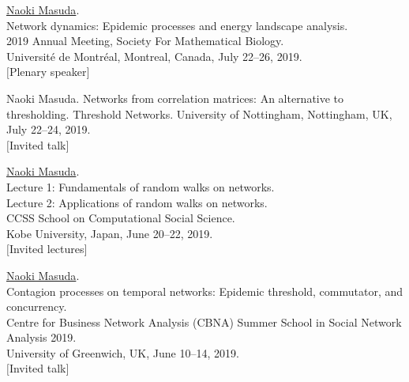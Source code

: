 \documentclass[11pt,letter]{article}
\begin{document}
\begin{etaremune}
\item \underline{Naoki Masuda}.\\
Network dynamics: Epidemic processes and energy landscape analysis.\\
2019 Annual Meeting, Society For Mathematical Biology.\\
Universit\'{e} de Montr\'{e}al, Montreal, Canada, July 22--26, 2019.\\
$[$Plenary speaker$]$

\item Naoki Masuda.
Networks from correlation matrices: An alternative to thresholding.
Threshold Networks. University of Nottingham, Nottingham, UK, July 22--24, 2019.\\
$[$Invited talk$]$

\item \underline{Naoki Masuda}.\\
Lecture 1: Fundamentals of random walks on networks.\\
Lecture 2: Applications of random walks on networks.\\
CCSS
School on Computational Social Science.\\
Kobe University, Japan, June 20--22, 2019.\\
$[$Invited lectures$]$

\item \underline{Naoki Masuda}.\\
Contagion processes on temporal networks: Epidemic threshold, commutator, and concurrency.\\
Centre for Business Network Analysis (CBNA) Summer School in Social Network Analysis 2019.\\
University of Greenwich, UK, June 10--14, 2019.\\
$[$Invited talk$]$

%


\end{etaremune}
\end{document}
